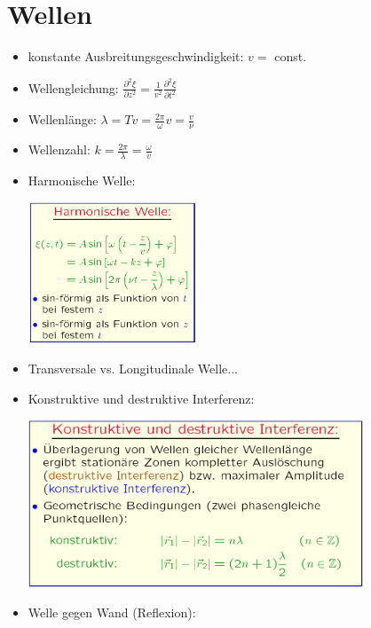 \documentclass[a4paper,10pt, fleqn]{article}
\begin{document}
\section{Wellen}
\label{sec:wellen}

\begin{itemize}
\item konstante Ausbreitungsgeschwindigkeit: $v = $ const.
\item Wellengleichung: $\frac{\partial^2\xi}{\partial z^2} = \frac{1}{v^2} \frac{\partial^2 \xi}{\partial t^2}$
\item Wellenlänge: $\lambda = Tv = \frac{2\pi}{\omega} v = \frac{v}{\nu}$
\item Wellenzahl: $k = \frac{2\pi}{\lambda} = \frac{\omega}{v}$
\item Harmonische Welle:

\includegraphics[width=5cm]{HarmonischeWelle}
\item Transversale vs. Longitudinale Welle...
\item Konstruktive und destruktive Interferenz:

\includegraphics[width=10cm]{Interferenz}
\item Welle gegen Wand (Reflexion):


\end{itemize}
\end{document}

